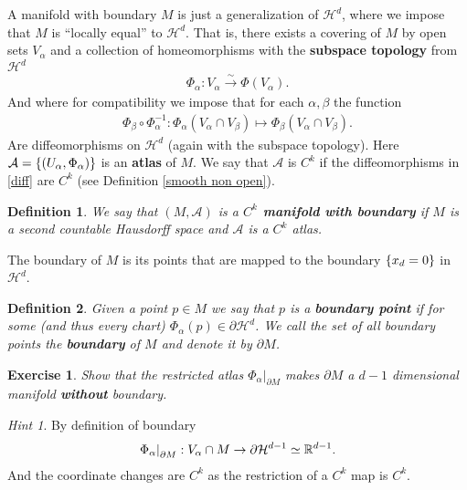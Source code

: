 \documentclass[12pt]{article}
\newtheorem{definition}{Definition}
\newtheorem{exercise}{Exercise}
\theoremstyle{remark}
\newtheorem*{hint}{Hint}
\newcommand{\iso}{\xrightarrow{\sim}}
\newcommand{\Aa}{\mathcal{A}}\newcommand{\Bb}{\mathcal{B}}\newcommand{\Cc}{\mathcal{C}}\newcommand{\Dd}{\mathcal{D}}\newcommand{\Ee}{\mathcal{E}}\newcommand{\Ff}{\mathcal{F}}\newcommand{\Gg}{\mathcal{G}}\newcommand{\Hh}{\mathcal{H}}\newcommand{\Kk}{\mathcal{K}}\newcommand{\Ll}{\mathcal{L}}\newcommand{\Mm}{\mathcal{M}}\newcommand{\Nn}{\mathcal{N}}\newcommand{\Pp}{\mathcal{P}}\newcommand{\Qq}{\mathcal{Q}}\newcommand{\Rr}{\mathcal{R}}\newcommand{\Ss}{\mathcal{S}}\newcommand{\Tt}{\mathcal{T}}\newcommand{\Uu}{\mathcal{U}}\newcommand{\Ww}{\mathcal{W}}\newcommand{\XX}{\mathcal {X}}\newcommand{\Zz}{\mathcal{Z}}
\newcommand\restr[2]{\left.#1\right|_{#2}}
\begin{document}
A manifold with boundary $M$ is just a generalization of $\Hh^d$, where we impose that $M$ is ``locally equal'' to $\Hh^d$. That is, there exists a covering of $M$ by open sets  $V_\alpha$ and a collection of homeomorphisms with the \textbf{subspace topology} from $\Hh^d$
\begin{align}\label{chart}
	\Phi_\alpha : V_\alpha \iso  \Phi(V_\alpha).
\end{align}
And where for compatibility we impose that for each $\alpha,\beta $ the function
\begin{align}\label{diff}
	\Phi_\beta \circ\Phi_\alpha^{-1}: \Phi_\alpha(V_\alpha\cap V_\beta ) \longmapsto \Phi_\beta (V_\alpha\cap V_\beta ).
\end{align}
Are diffeomorphisms on $\Hh^d$ (again with the subspace topology). Here $\Aa=\set{(U_\alpha,\Phi_\alpha)} $ is an \textbf{atlas} of $M$. We say that $\Aa$ is $C^k$ if the diffeomorphisms in \eqref{diff} are $C^k$ (see Definition \ref{smooth non open}).

\begin{definition}
	We say that $(M,\Aa)$ is a \textbf{$C^k$ manifold with boundary} if $M$ is a second countable Hausdorff space and $\Aa$ is a $C^k$ atlas.
\end{definition}
The boundary of $M$ is its points that are mapped to the boundary $\left\{x_d=0\right\} $ in $\Hh^d$.
\begin{definition}
	Given a point $p \in M$ we say that $p$ is a \textbf{boundary point} if for some (and thus every chart) $\Phi_\alpha(p) \in \partial \Hh ^{d}$. We call the set of all boundary points the \textbf{boundary} of $M$ and denote it by $\partial M$.
\end{definition}
\begin{exercise}
	Show that the restricted atlas $\restr{\Phi_\alpha}{\partial M}$ makes $\partial M$ a $d-1$ dimensional manifold \textbf{without} boundary.
\end{exercise}
\begin{hint}
	By definition of boundary
	\begin{align}\label{chart2}
		\restr{\Phi_\alpha}{\partial M}: V_\alpha \cap M \to \partial \Hh^{d-1} \simeq \R^{d-1}.
	\end{align}
	And the coordinate changes are $C^k$ as the restriction of a $C^k$ map is $C^k$.
\end{hint}
\end{document}
